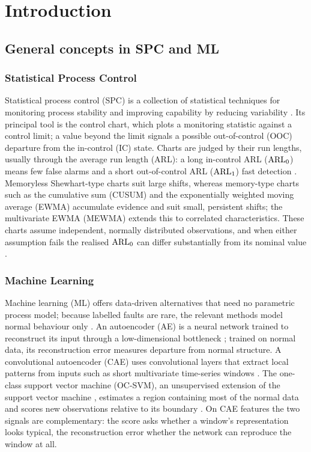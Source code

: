 \section{Introduction}

\subsection{General concepts in SPC and ML}

\subsubsection{Statistical Process Control}

Statistical process control (SPC) is a collection of statistical techniques for monitoring process
stability and improving capability by reducing variability \citep{montgomery_statistical_2012}. Its
principal tool is the control chart, which plots a monitoring statistic against a control limit;
a value beyond the limit signals a possible out-of-control (OOC) departure from the in-control (IC)
state. Charts are judged by their run lengths, usually through the average run length (ARL): a long
in-control ARL ($\mathrm{ARL}_0$) means few false alarms and a short out-of-control ARL ($\mathrm{ARL}_1$) fast
detection \citep{ahmed_statistical_2017}. Memoryless Shewhart-type charts suit large shifts, whereas
memory-type charts such as the cumulative sum (CUSUM) \citep{page_continuous_1954} and the
exponentially weighted moving average (EWMA) \citep{roberts_control_1959} accumulate evidence and
suit small, persistent shifts; the multivariate EWMA (MEWMA) \citep{lowry_multivariate_1992} extends
this to correlated characteristics. These charts assume independent, normally distributed
observations, and when either assumption fails the realised $\mathrm{ARL}_0$ can differ substantially from
its nominal value \citep{lowry_multivariate_1992,ahmed_statistical_2017}.

\subsubsection{Machine Learning}

Machine learning (ML) offers data-driven alternatives that need no parametric process model; because
labelled faults are rare, the relevant methods model normal behaviour only
\citep{pimentel_review_2014}. An autoencoder (AE) is a neural network trained to reconstruct its input
through a low-dimensional bottleneck \citep{hinton_reducing_2006}; trained on normal data, its
reconstruction error measures departure from normal structure. A convolutional autoencoder (CAE) uses
convolutional layers
that extract local patterns from inputs such as short multivariate time-series windows
\citep{lecun_gradient-based_1998,honkela_stacked_2011}. The one-class support vector machine
(OC-SVM), an unsupervised extension of the support vector machine \citep{cortes_support-vector_1995},
estimates a region containing most of the normal data and scores new observations relative to its
boundary \citep{scholkopf_estimating_2001}. On CAE features the two signals are complementary: the
score asks whether a window's representation looks typical, the reconstruction error whether the
network can reproduce the window at all.

